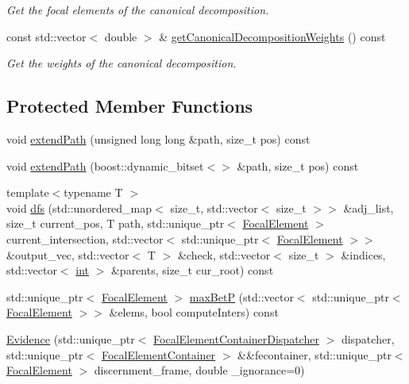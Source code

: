 \begin{DoxyCompactItemize}
\begin{DoxyCompactList}\small\item\em Get the focal elements of the canonical decomposition. \end{DoxyCompactList}\item 
const std\+::vector$<$ double $>$ \& \hyperlink{classEvidence_a712ef648ec40baa3c959079b44f2d99c}{get\+Canonical\+Decomposition\+Weights} () const 
\begin{DoxyCompactList}\small\item\em Get the weights of the canonical decomposition. \end{DoxyCompactList}\end{DoxyCompactItemize}
\subsection*{Protected Member Functions}
\begin{DoxyCompactItemize}
\item 
void \hyperlink{classEvidence_a3d0206e5bbb6e8e61ad766c43d6e9113}{extend\+Path} (unsigned long long \&path, size\+\_\+t pos) const 
\item 
void \hyperlink{classEvidence_ae732467027722ccd1a3bd690110e21a3}{extend\+Path} (boost\+::dynamic\+\_\+bitset$<$$>$ \&path, size\+\_\+t pos) const 
\item 
{\footnotesize template$<$typename T $>$ }\\void \hyperlink{classEvidence_aaf90200d5b72268052a4c3df429b1932}{dfs} (std\+::unordered\+\_\+map$<$ size\+\_\+t, std\+::vector$<$ size\+\_\+t $>$$>$ \&adj\+\_\+list, size\+\_\+t current\+\_\+pos, T path, std\+::unique\+\_\+ptr$<$ \hyperlink{classFocalElement}{Focal\+Element} $>$ current\+\_\+intersection, std\+::vector$<$ std\+::unique\+\_\+ptr$<$ \hyperlink{classFocalElement}{Focal\+Element} $>$$>$ \&output\+\_\+vec, std\+::vector$<$ T $>$ \&check, std\+::vector$<$ size\+\_\+t $>$ \&indices, std\+::vector$<$ \hyperlink{CMakeCache_8txt_a79a3d8790b2588b09777910863574e09}{int} $>$ \&parents, size\+\_\+t cur\+\_\+root) const 
\item 
std\+::unique\+\_\+ptr$<$ \hyperlink{classFocalElement}{Focal\+Element} $>$ \hyperlink{classEvidence_aa2580207b322e297cdd0c3af07ddcd21}{max\+BetP} (std\+::vector$<$ std\+::unique\+\_\+ptr$<$ \hyperlink{classFocalElement}{Focal\+Element} $>$$>$ \&elems, bool compute\+Inters) const 
\item 
\hyperlink{classEvidence_a8136cd1d58c59e4b6a5088e9ac581797}{Evidence} (std\+::unique\+\_\+ptr$<$ \hyperlink{classFocalElementContainerDispatcher}{Focal\+Element\+Container\+Dispatcher} $>$ dispatcher, std\+::unique\+\_\+ptr$<$ \hyperlink{classFocalElementContainer}{Focal\+Element\+Container} $>$ \&\&fecontainer, std\+::unique\+\_\+ptr$<$ \hyperlink{classFocalElement}{Focal\+Element} $>$ discernment\+\_\+frame, double \+\_\+ignorance=0)
\end{DoxyCompactItemize}


